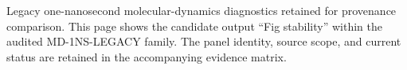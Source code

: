Legacy one-nanosecond molecular-dynamics diagnostics retained for provenance comparison. This page shows the candidate output ``Fig stability'' within the audited MD-1NS-LEGACY family. The panel identity, source scope, and current status are retained in the accompanying evidence matrix.
